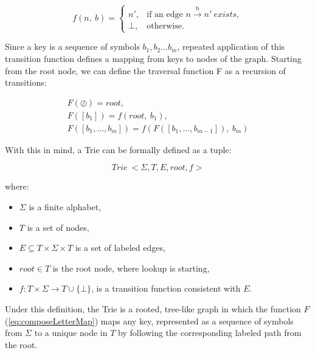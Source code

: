 \documentclass[11pt,twoside]{article}
\begin{document}
    \begin{equation}
        f(n,~b)=
        \begin{cases}
            n', & \text{if an edge } n \xrightarrow{\text{b}}n' ~exists,\\
            \bot, & \text{otherwise}.
        \end{cases}\label{eq:mappingFunction}
    \end{equation}


    Since a key is a sequence of symbols \(b_1, b_2\dots b_m\), repeated application of this
    transition function defines a mapping from keys to nodes of the graph. Starting from the
    root node, we can define the traversal function F as a recursion of transitions:

    \begin{equation}
        \begin{array}{ll}
            F(\oslash) = root, \\
            F([b_{1}]) = f(root,~b_{1}), \\
            F([b_{1}, \ldots, b_{m}]) = f(F([b_{1},\ldots, b_{m-1}]),~b_{m})
        \end{array}
        \label{eq:composeLetterMap}
    \end{equation}

    With this in mind, a Trie can be formally defined as a tuple:

    \begin{equation}
        Trie \: < \Sigma, T, E, root, f >
    \end{equation}

    where:

    \begin{itemize}
        \item
        $\Sigma$ is a finite alphabet,
        \item
        $T$ is a set of nodes,
        \item
        \(E \subseteq T \times \Sigma \times T\) is a set of labeled edges,
        \item
        \(root \in T\) is the root node, where lookup is starting,
        \item
        \(f:T \times \Sigma \rightarrow T \cup \{\bot\}\), is a transition
        function consistent with $E$.
    \end{itemize}

    Under this definition, the Trie is a rooted, tree-like graph in which
    the function $F$ (\ref{eq:composeLetterMap}) maps any key, represented as a sequence of symbols
    from $\Sigma$ to a unique node in $T$ by following the corresponding labeled
    path from the root.
\end{document}
